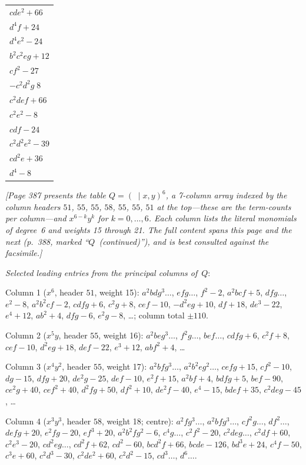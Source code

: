 \documentclass[11pt]{article}
\begin{document}
\begin{center}
\begin{tabular}{|l|}
$cde^{2}+66$\\
$d^{4}f+24$\\
$d^{4}e^{2}-24$\\
$b^{2}c^{2}eg+12$\\
$cf^{2}-27$\\
$-c^{2}d^{2}g\;8$\\
$c^{2}def+66$\\
$c^{2}e^{2}-8$\\
$cdf-24$\\
$c^{2}d^{2}e^{2}-39$\\
$cd^{2}e+36$\\
$d^{4}-8$\\
\hline
\end{tabular}
\end{center}

\newpage

\noindent
\textit{[Page 387 presents the table $Q=(\;\mid x,y)^{6}$, a 7-column
array indexed by the column headers $51$, $55$, $55$, $58$, $55$,
$55$, $51$ at the top---these are the term-counts per column---and
$x^{6-k}y^{k}$ for $k=0,\ldots,6$.  Each column lists the literal
monomials of degree~6 and weights 15 through 21.  The full content
spans this page and the next (p.~388, marked
``$Q$~(continued)''), and is best consulted against the facsimile.]}

\medskip
\noindent
\textit{Selected leading entries from the principal columns of}~$Q$:
\smallskip

\noindent
Column 1 ($x^{6}$, header $51$, weight 15):
$a^{2}bdg^{3}\ldots$, $efg\ldots$, $f^{2}-2$, $a^{2}bcf+5$,
$dfg\ldots$, $e^{2}-8$, $a^{2}b^{2}cf-2$, $cdfg+6$, $c^{2}g+8$,
$cef-10$, $-d^{2}eg+10$, $df+18$, $de^{3}-22$, $e^{4}+12$,
$ab^{2}+4$, $dfg-6$, $e^{2}g-8$, \ldots; column total $\pm 110$.
\smallskip

\noindent
Column 2 ($x^{5}y$, header $55$, weight 16):
$a^{2}beg^{3}\ldots$, $f^{2}g\ldots$, $bef\ldots$, $cdfg+6$,
$c^{2}f+8$, $cef-10$, $d^{2}eg+18$, $def-22$, $e^{3}+12$,
$abf^{2}+4$, \ldots
\smallskip

\noindent
Column 3 ($x^{4}y^{2}$, header $55$, weight 17):
$a^{2}bf g^{3}\ldots$, $a^{2}b^{2}eg^{2}\ldots$, $cefg+15$,
$cf^{2}-10$, $dg-15$, $dfg+20$, $de^{2}g-25$, $def-10$,
$e^{2}f+15$, $a^{2}bf+4$, $bdfg+5$, $bef-90$, $ce^{2}g+40$,
$cef^{2}+40$, $d^{2}fg+50$, $df^{2}+10$, $de^{2}f-40$, $e^{4}-15$,
$bdef+35$, $c^{2}deg-45$, \ldots
\smallskip

\noindent
Column 4 ($x^{3}y^{3}$, header $58$, weight 18; centre):
$a^{2}fg^{3}\ldots$, $a^{2}bfg^{3}\ldots$, $cf^{2}g\ldots$,
$df^{2}\ldots$, $defg+20$, $e^{2}fg-20$, $ef^{3}+20$,
$a^{2}b^{2}fg^{2}-6$, $c^{4}g\ldots$, $c^{2}f^{2}-20$,
$c^{2}deg\ldots$, $c^{2}df+60$, $c^{2}e^{3}-20$, $cd^{2}eg\ldots$,
$cd^{2}f+62$, $cd^{2}-60$, $bcd^{2}f+66$, $bcde-126$, $bd^{3}e+24$,
$c^{4}f-50$, $c^{3}e+60$, $c^{2}d^{3}-30$, $c^{2}de^{2}+60$,
$c^{2}d^{2}-15$, $cd^{3}\ldots$, $d^{6}\ldots$.
\smallskip
\end{document}
